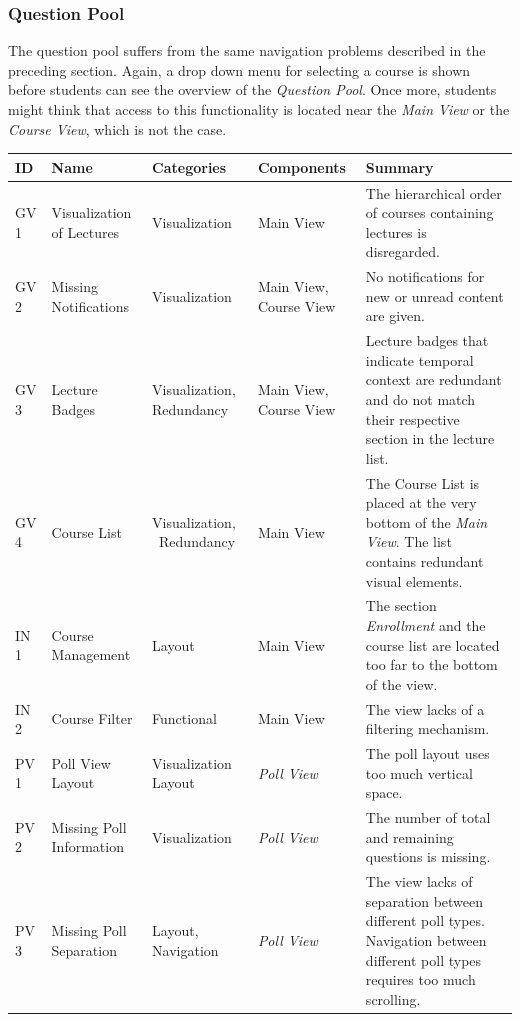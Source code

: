 \subsubsection{Question Pool}

The question pool suffers from the same navigation problems described in the preceding section. Again, a drop down menu for selecting a course is shown before students can see the overview of the \emph{Question Pool}. Once more, students might think that access to this functionality is located near the \emph{Main View} or the \emph{Course View}, which is not the case.
\cleardoublepage
\renewcommand*{\arraystretch}{1.4}
\begin{longtable}{ | p{0.8cm} | p{2cm} | p{2cm} | p{2.2cm} | p{5.8cm} |}
	\hline
	ID & Name & Categories & Components & Summary \\ \hline \hline
	GV 1 & Visualization of Lectures & Visualization & Main View & The hierarchical order of courses containing lectures is disregarded. \\ \hline
	GV 2 & Missing Notifications & Visualization & Main View, \newline Course View & No notifications for new or unread content are given. \\ \hline
	GV 3 & Lecture Badges & Visualization, \newline Redundancy & Main View, \newline Course View & Lecture badges that indicate temporal context are redundant and do not match their respective section in the lecture list. \\ \hline
	GV 4 & Course List & Visualization, \ Redundancy & Main View & The Course List is placed at the very bottom of the \emph{Main View}. The list contains redundant visual elements. \\ \hline
	IN 1 & Course Management & Layout & Main View & The section \emph{Enrollment} and the course list are located too far to the bottom of the view. \\ \hline
	IN 2 & Course Filter & Functional & Main View & The view lacks of a filtering mechanism. \\ \hline
	PV 1 & Poll View Layout & Visualization \newline Layout & \emph{Poll View} & The poll layout uses too much vertical space. \\ \hline
	PV 2 & Missing Poll Information & Visualization & \emph{Poll View} & The number of total and remaining questions is missing. \\ \hline
	PV 3 & Missing Poll Separation & Layout, \newline Navigation & \emph{Poll View} & The view lacks of separation between different poll types. Navigation between different poll types requires too much scrolling. \\ \hline

\end{longtable}
